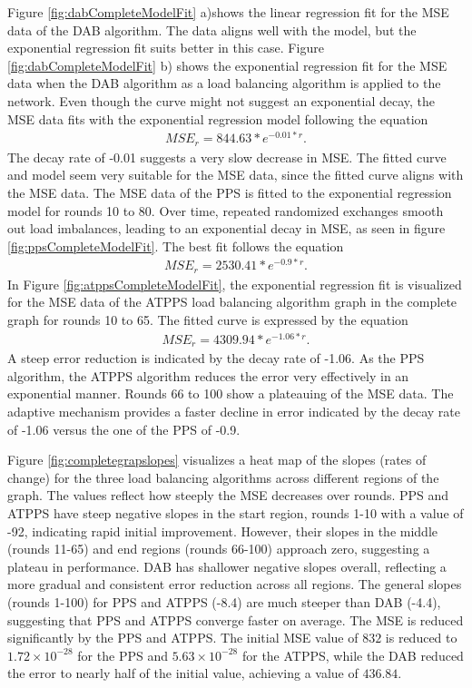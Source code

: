 Figure \ref{fig:dabCompleteModelFit} a)shows the linear regression fit for the MSE data of the DAB algorithm. The data aligns well with the model, but the exponential regression fit suits better in this case. Figure \ref{fig:dabCompleteModelFit} b) shows the exponential regression fit for the MSE data when the DAB algorithm as a load balancing algorithm is applied to the network. Even though the curve might not suggest an exponential decay, the MSE data fits with the exponential regression model following the equation
\begin{align}
    MSE_r=844.63*e^{-0.01*r}.    
\end{align}
The decay rate of -0.01 suggests a very slow decrease in MSE. The fitted curve and model seem very suitable for the MSE data, since the fitted curve aligns with the MSE data. The MSE data of the PPS is fitted to the exponential regression model for rounds 10 to 80. Over time, repeated randomized exchanges smooth out load imbalances, leading to an exponential decay in MSE, as seen in figure \ref{fig:ppsCompleteModelFit}. The best fit follows the equation
\begin{align}
    MSE_r=2530.41*e^{-0.9*r}.    
\end{align}
In Figure \ref{fig:atppsCompleteModelFit}, the exponential regression fit is visualized for the MSE data of the ATPPS load balancing algorithm graph in the complete graph for rounds 10 to 65. The fitted curve is expressed by the equation
\begin{align}
    MSE_r=4309.94*e^{-1.06*r}.    
\end{align}
A steep error reduction is indicated by the decay rate of -1.06. As the PPS algorithm, the ATPPS algorithm reduces the error very effectively in an exponential manner. Rounds 66 to 100 show a plateauing of the MSE data. The adaptive mechanism provides a faster decline in error indicated by the decay rate of -1.06 versus the one of the PPS of -0.9.

Figure \ref{fig:completegrapslopes} visualizes a heat map of the slopes (rates of change) for the three load balancing algorithms across different regions of the graph. The values reflect how steeply the MSE decreases over rounds. PPS and ATPPS have steep negative slopes in the start region, rounds 1-10 with a value of -92, indicating rapid initial improvement. However, their slopes in the middle (rounds 11-65) and end regions (rounds 66-100) approach zero, suggesting a plateau in performance. DAB has shallower negative slopes overall, reflecting a more gradual and consistent error reduction across all regions. The general slopes (rounds 1-100) for PPS and ATPPS (-8.4) are much steeper than DAB (-4.4), suggesting that PPS and ATPPS converge faster on average. The MSE is reduced significantly by the PPS and ATPPS. The initial MSE value of $832$ is reduced to $1.72 \times 10^{-28}$ for the PPS and $5.63 \times 10^{-28}$ for the ATPPS, while the DAB reduced the error to nearly half of the initial value, achieving a value of $436.84$.

